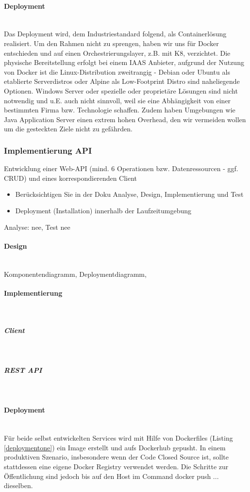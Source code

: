 \documentclass[notitlepage, hidelinks]{article}
\begin{document}
\paragraph{Deployment} \mbox{} \\
Das Deployment wird, dem Industriestandard folgend, als Containerlösung realisiert. Um den Rahmen nicht zu sprengen, haben wir uns für Docker entschieden und auf einen Orchestrierungslayer, z.B. mit K8, verzichtet. Die physische Bereitstellung erfolgt bei einem IAAS Anbieter, aufgrund der Nutzung von Docker ist die Linux-Distribution zweitrangig - Debian oder Ubuntu als etablierte Serverdistros oder Alpine als Low-Footprint Distro sind naheliegende Optionen. Windows Server oder spezielle oder proprietäre Lösungen sind nicht notwendig und u.E. auch nicht sinnvoll, weil sie eine Abhängigkeit von einer bestimmten Firma bzw. Technologie schaffen. Zudem haben Umgebungen wie Java Application Server einen extrem hohen Overhead, den wir vermeiden wollen um die gesteckten Ziele nicht zu gefährden. 

\subsubsection{Implementierung API}
Entwicklung einer Web-API (mind. 6 Operationen bzw. Datenressourcen - ggf. CRUD) und eines korrespondierenden Client
\begin{itemize}
\item Berücksichtigen Sie in der Doku Analyse, Design, Implementierung und Test
\item Deployment (Installation) innerhalb der Laufzeitumgebung
\end{itemize}

Analyse: nee, Test nee

\paragraph{Design} \mbox{} \\
Komponentendiagramm, Deploymentdiagramm, 

\paragraph{Implementierung} \mbox{} \\
\subparagraph{Client} \mbox{} \\
\subparagraph{REST API} \mbox{} \\
\paragraph{Deployment} \mbox{} \\
 Für beide selbst entwickelten Services wird mit Hilfe von Dockerfiles (Listing \ref{deploymentone}) ein Image erstellt und aufs Dockerhub gepusht. In einem produktiven Szenario, insbesondere wenn der Code Closed Source ist, sollte stattdessen eine eigene Docker Registry verwendet werden. Die Schritte zur Öffentlichung sind jedoch bis auf den Host im Command docker push ... dieselben. 
\end{document}
